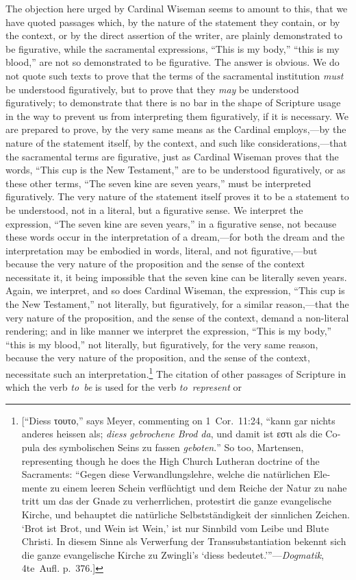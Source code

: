\documentclass[
]{book}
\begin{document}
The objection here urged by Cardinal Wiseman seems to amount to this, that we have quoted passages which, by the nature of the statement they contain, or by the context, or by the direct assertion of the writer, are plainly demonstrated to be figurative, while the sacramental expressions, ``This is my body,'' ``this is my blood,'' are not so demonstrated to be figurative. The answer is obvious. We do not quote such texts to prove that the terms of the sacramental institution \emph{must} be understood figuratively, but to prove that they \emph{may} be understood figuratively; to demonstrate that there is no bar in the shape of Scripture usage in the way to prevent us from interpreting them figuratively, if it is necessary. We are prepared to prove, by the very same means as the Cardinal employs,---by the nature of the statement itself, by the context, and such like considerations,---that the sacramental terms are figurative, just as Cardinal Wiseman proves that the words, ``This cup is the New Testament,'' are to be understood figuratively, or as these other terms, ``The seven kine are seven years,'' must be interpreted figuratively. The very nature of the statement itself proves it to be a statement to be understood, not in a literal, but a figurative sense. We interpret the expression, ``The seven kine are seven years,'' in a figurative sense, not because these words occur in the interpretation of a dream,---for both the dream and the interpretation may be embodied in words, literal, and not figurative,---but because the very nature of the proposition and the sense of the context necessitate it, it being impossible that the seven kine can be literally seven years. Again, we interpret, and so does Cardinal Wiseman, the expression, ``This cup is the New Testament,'' not literally, but figuratively, for a similar reason,---that the very nature of the proposition, and the sense of the context, demand a non-literal rendering; and in like manner we interpret the expression, ``This is my body,'' ``this is my blood,'' not literally, but figuratively, for the very same reason, because the very nature of the proposition, and the sense of the context, necessitate such an interpretation.\footnote{{[}``\foreignlanguage{ngerman}{Diess \foreignlanguage{greek}{τουτο}},'' says Meyer, commenting on 1~Cor.~11:24, ``\foreignlanguage{ngerman}{kann gar nichts anderes heissen als; \emph{diess gebrochene Brod da}, und damit ist \foreignlanguage{greek}{εστι} als die Copula des symbolischen Seins zu fassen \emph{geboten}.}'' So too, Martensen, representing though he does the High Church Lutheran doctrine of the Sacraments: ``\foreignlanguage{ngerman}{Gegen diese Verwandlungslehre, welche die natürlichen Elemente zu einem leeren Schein verflüchtigt und dem Reiche der Natur zu nahe tritt um das der Gnade zu verherrlichen, protestirt die ganze evangelische Kirche, und behauptet die natürliche Selbstständigkeit der sinnlichen Zeichen. `Brot ist Brot, und Wein ist Wein,' ist nur Sinnbild vom Leibe und Blute Christi. In diesem Sinne als Verwerfung der Transsubstantiation bekennt sich die ganze evangelische Kirche zu Zwingli's `diess bedeutet.'}''---\emph{Dogmatik}, 4te~Aufl. p.~376.{]}} The citation of other passages of Scripture in which the verb \emph{to~be} is used for the verb \emph{to~represent} or 
\end{document}
